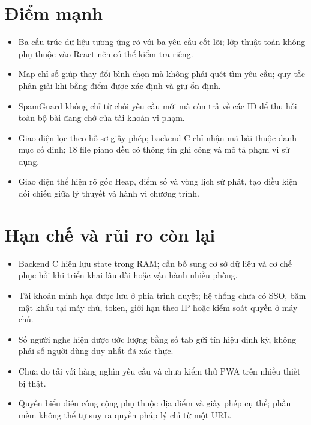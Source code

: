 \documentclass[12pt,a4paper,twoside,openright]{report}
\begin{document}
\section{Điểm mạnh}
\begin{itemize}
  \item Ba cấu trúc dữ liệu tương ứng rõ với ba yêu cầu cốt lõi; lớp thuật toán không phụ
  thuộc vào React nên có thể kiểm tra riêng.
  \item Map chỉ số giúp thay đổi bình chọn mà không phải quét tìm yêu cầu; quy tắc phân giải
  khi bằng điểm được xác định và giữ ổn định.
  \item SpamGuard không chỉ từ chối yêu cầu mới mà còn trả về các ID để thu hồi toàn bộ bài
  đang chờ của tài khoản vi phạm.
  \item Giao diện lọc theo hồ sơ giấy phép; backend C chỉ nhận mã bài thuộc danh mục cố định;
  18 file piano đều có thông tin ghi công và mô tả phạm vi sử dụng.
  \item Giao diện thể hiện rõ gốc Heap, điểm số và vòng lịch sử phát, tạo điều kiện đối chiếu
  giữa lý thuyết và hành vi chương trình.
\end{itemize}

\section{Hạn chế và rủi ro còn lại}
\begin{itemize}
  \item Backend C hiện lưu state trong RAM; cần bổ sung cơ sở dữ liệu và cơ chế phục hồi
  khi triển khai lâu dài hoặc vận hành nhiều phòng.
  \item Tài khoản minh họa được lưu ở phía trình duyệt; hệ thống chưa có SSO, băm mật khẩu
  tại máy chủ, token, giới hạn theo IP hoặc kiểm soát quyền ở máy chủ.
  \item Số người nghe hiện được ước lượng bằng số tab gửi tín hiệu định kỳ, không phải số
  người dùng duy nhất đã xác thực.
  \item Chưa đo tải với hàng nghìn yêu cầu và chưa kiểm thử PWA trên nhiều thiết bị thật.
  \item Quyền biểu diễn công cộng phụ thuộc địa điểm và giấy phép cụ thể; phần mềm không
  thể tự suy ra quyền pháp lý chỉ từ một URL.
\end{itemize}
\end{document}
